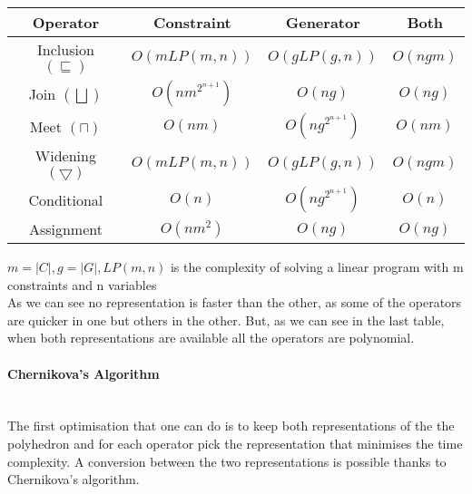 \begin{center}
\begin{tabular}{||c c c c||} 
 
 \hline
 Operator & Constraint & Generator & Both \\ [0.5ex] 
 \hline
 Inclusion $(\sqsubseteq)$ & $O(mLP(m,n))$ & $O(gLP(g,n))$ & $O(ngm)$ \\ 
 \hline
 Join $(\bigsqcup)$ & $O(nm^{2^{n+1}})$ & $O(ng)$ & $O(ng)$ \\
 \hline
 Meet $(\sqcap)$ & $O(nm)$ & $O(ng^{2^{n+1}})$ & $O(nm)$\\
 \hline
 Widening $(\bigtriangledown)$ & $O(mLP(m,n))$ & $O(gLP(g,n))$ & $O(ngm)$ \\
 \hline
 Conditional & $O(n)$ & $O(ng^{2^{n+1}})$ & $O(n)$ \\ 
 \hline
 Assignment & $O(nm^2)$ & $O(ng)$ & $O(ng)$ \\ 
 
 
 \hline
\end{tabular}
\end{center}
$m=|C|,g=|G|,LP(m,n)$ is the complexity of solving a linear program with m constraints and n variables\\
As we can see no representation is faster than the other, as some of the operators are quicker in one but others in the other. But, as we can see in the last table, when both representations are available all the operators are polynomial.\\
\paragraph{Chernikova's Algorithm} \mbox{}\\
 The first optimisation that one can do is to keep both representations of the the polyhedron and for each operator pick the representation that minimises the time complexity. A conversion between the two representations is possible thanks to Chernikova's algorithm\cite{chernikova1968algorithm}. 
 

